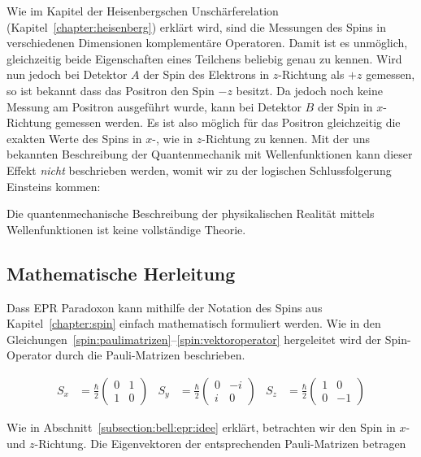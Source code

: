 \begin{refsection}
Wie im Kapitel der Heisenbergschen Unsch\"arferelation 
(Kapitel~\ref{chapter:heisenberg})
erkl\"art wird, sind die Messungen des Spins in verschiedenen Dimensionen 
komplement\"are Operatoren.
Damit ist es unm\"oglich, gleichzeitig beide Eigenschaften eines Teilchens
beliebig genau zu kennen.
Wird nun jedoch bei Detektor $A$ der Spin des Elektrons in $z$-Richtung 
als $+z$ gemessen, so ist bekannt dass das Positron den Spin $-z$ besitzt.
Da jedoch noch keine Messung am Positron ausgef\"uhrt wurde, kann bei
Detektor $B$ der Spin in $x$-Richtung gemessen werden.
Es ist also m\"oglich f\"ur das Positron gleichzeitig die exakten Werte 
des Spins in $x$-, wie in $z$-Richtung zu kennen. 
Mit der uns bekannten Beschreibung der Quantenmechanik mit Wellenfunktionen
kann dieser Effekt \emph{nicht} beschrieben werden, womit wir zu der
logischen Schlussfolgerung Einsteins kommen:

\begin{satz}
    Die quantenmechanische Beschreibung der physikalischen Realit\"at mittels
    Wellenfunktionen ist keine vollst\"andige Theorie.
\end{satz}

\subsection{Mathematische Herleitung\label{subsection:bell:epr:herleitung}}
Dass EPR Paradoxon kann mithilfe der Notation des Spins aus 
Kapitel~\ref{chapter:spin}  einfach mathematisch formuliert werden.
Wie in den Gleichungen~\ref{spin:paulimatrizen}--\ref{spin:vektoroperator}
hergeleitet wird der Spin-Operator durch die Pauli-Matrizen beschrieben.

\begin{align}
    S_x &= \frac{\hbar}{2} \begin{pmatrix}
    0 & 1 \\ 1 & 0
    \end{pmatrix}
    &
    S_y &= \frac{\hbar}{2} \begin{pmatrix}
    0 & -i \\ i & 0
    \end{pmatrix}
    &
    S_z &= \frac{\hbar}{2} \begin{pmatrix}
    1 & 0 \\ 0 & -1
    \end{pmatrix}\label{equ:bell:paulimatrizen}
\end{align}

Wie in Abschnitt~\ref{subsection:bell:epr:idee} erkl\"art, betrachten wir
den Spin in $x$- und $z$-Richtung.
Die Eigenvektoren der entsprechenden Pauli-Matrizen betragen


\end{refsection}
